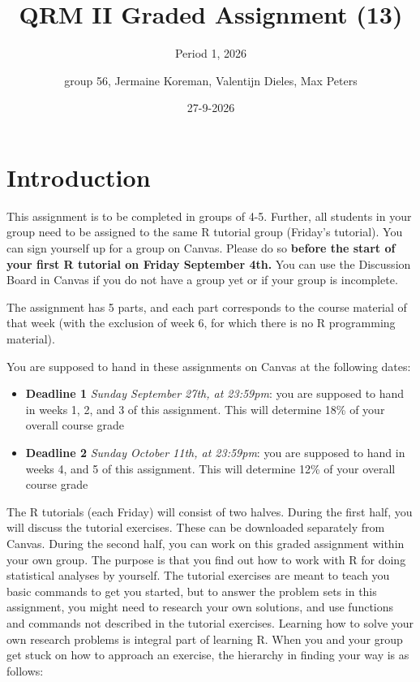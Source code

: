 \documentclass[
]{article}
\title{QRM II Graded Assignment (13)}
\subtitle{Period 1, 2026}
\author{group 56, Jermaine Koreman, Valentijn Dieles, Max Peters}
\date{27-9-2026}
\providecommand{\tightlist}{%
  \setlength{\itemsep}{0pt}\setlength{\parskip}{0pt}}
\begin{document}
\maketitle

\section{Introduction}\label{introduction}

This assignment is to be completed in groups of 4-5. Further, all
students in your group need to be assigned to the same R tutorial group
(Friday's tutorial). You can sign yourself up for a group on Canvas.
Please do so
\textbf{before the start of your first R tutorial on Friday September 4th.}
You can use the Discussion Board in Canvas if you do not have a group
yet or if your group is incomplete.

The assignment has 5 parts, and each part corresponds to the course
material of that week (with the exclusion of week 6, for which there is
no R programming material).

You are supposed to hand in these assignments on Canvas at the following
dates:

\begin{itemize}
\tightlist
\item
  \textbf{Deadline 1} \emph{Sunday September 27th, at 23:59pm}: you are
  supposed to hand in weeks 1, 2, and 3 of this assignment. This will
  determine 18\% of your overall course grade
\item
  \textbf{Deadline 2} \emph{Sunday October 11th, at 23:59pm}: you are
  supposed to hand in weeks 4, and 5 of this assignment. This will
  determine 12\% of your overall course grade
\end{itemize}

The R tutorials (each Friday) will consist of two halves. During the
first half, you will discuss the tutorial exercises. These can be
downloaded separately from Canvas. During the second half, you can work
on this graded assignment within your own group. The purpose is that you
find out how to work with R for doing statistical analyses by yourself.
The tutorial exercises are meant to teach you basic commands to get you
started, but to answer the problem sets in this assignment, you might
need to research your own solutions, and use functions and commands not
described in the tutorial exercises. Learning how to solve your own
research problems is integral part of learning R. When you and your
group get stuck on how to approach an exercise, the hierarchy in finding
your way is as follows:
\end{document}
